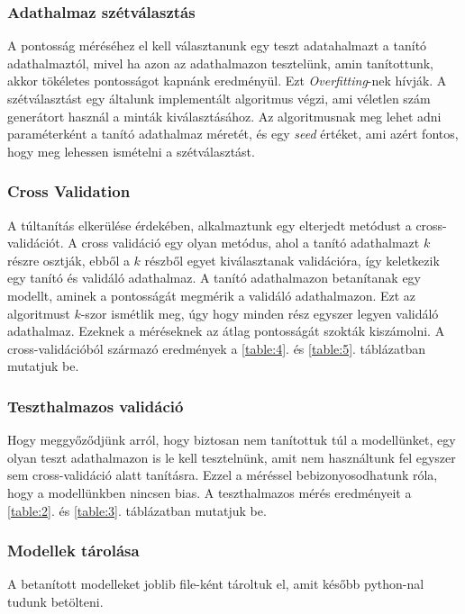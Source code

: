 \documentclass[acmtog, authorversion]{acmart}
\begin{document}
\subsubsection{Adathalmaz szétválasztás}
A pontosság méréséhez el kell választanunk egy teszt adatahalmazt a tanító adathalmaztól, mivel ha azon az adathalmazon tesztelünk, amin tanítottunk,
akkor tökéletes pontosságot kapnánk eredményül. Ezt \emph{Overfitting}-nek hívják. A szétválasztást egy általunk implementált algoritmus végzi, ami véletlen szám generátort használ a
minták kiválasztásához. Az algoritmusnak meg lehet adni paraméterként a tanító adathalmaz méretét, és egy \emph{seed} értéket, ami azért fontos, hogy meg
lehessen ismételni a szétválasztást.
\subsubsection{Cross Validation}
A túltanítás elkerülése érdekében, alkalmaztunk egy elterjedt metódust a cross-validációt. A cross validáció egy olyan metódus, ahol a tanító adathalmazt
$k$ részre osztják, ebből a $k$ részből egyet kiválasztanak validációra, így keletkezik egy tanító és validáló adathalmaz. A tanító adathalmazon betanítanak
egy modellt, aminek a pontosságát megmérik a validáló adathalmazon. Ezt az algoritmust $k$-szor ismétlik meg, úgy hogy minden rész egyszer legyen validáló
adathalmaz. Ezeknek a méréseknek az átlag pontosságát szokták kiszámolni. A cross-validációból származó eredmények a \ref{table:4}. és \ref{table:5}. 
táblázatban mutatjuk be.
\subsubsection{Teszthalmazos validáció}
Hogy meggyőződjünk arról, hogy biztosan nem tanítottuk túl a modellünket, egy olyan teszt adathalmazon is le kell tesztelnünk, amit nem használtunk fel egyszer sem
cross-validáció alatt tanításra. Ezzel a méréssel bebizonyosodhatunk róla, hogy a modellünkben nincsen bias. A teszthalmazos mérés eredményeit a \ref{table:2}. és \ref{table:3}.
táblázatban mutatjuk be.
\subsubsection{Modellek tárolása}
A betanított modelleket joblib file-ként tároltuk el, amit később python-nal tudunk betölteni.
\end{document}
